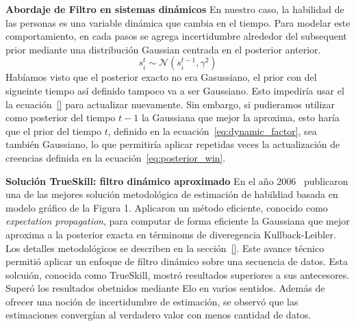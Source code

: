 \documentclass[article]{jss}
\newif\ifen
\newif\ifes
\newcommand{\en}[1]{\ifen#1\fi}
\newcommand{\es}[1]{\ifes#1\fi}
\newcommand{\N}{\mathcal{N}}
\begin{document}

\textbf{Abordaje de Filtro en sistemas dinámicos}
%
En nuestro caso, la habilidad de las personas es una variable dinámica que cambia en el tiempo.
%
Para modelar este comportamiento, en cada pasos se agrega incertidumbre alrededor del subsequent prior mediante una distribuci\'on Gaussian centrada en el posterior anterior.
%
\begin{equation}\label{eq:dynamic_factor}
 s_i^t \sim \N(s_i^{t-1}, \gamma^2)
 \end{equation}
%
Habíamos visto que el posterior exacto no era Gasussiano, el prior con del sigueinte tiempo así definido tampoco va a ser Gaussiano.
%
Esto impediría usar el la ecuación~\ref{} para actualizar nuevamente.
%
Sin embargo, si pudieramos utilizar como posterior del tiempo $t-1$ la Gaussiana que mejor la aproxima, esto haría que el prior del tiempo $t$, definido en la ecuación~\ref{eq:dynamic_factor}, sea también Gaussiano, lo que permitiría aplicar repetidas veces la actualización de creencias definida en la ecuación~\ref{eq:posterior_win}.
% 
\en{One of the main contributions of~\cite{herbrich2006-trueskill} was to offer an efficient method to find that Gaussian.}
\es{Uno de los principales aportes de~\cite{herbrich2006-trueskill} fue ofrecer un método eficiente para calcular esa Gaussiana.}



\textbf{Solución TrueSkill: filtro dinámico aproximado}
%
En el año 2006~\cite{herbrich2006-trueskill} publicaron una de las mejores solución metodológica de estimación de habildiad basada en modelo gráfico de la Figura 1.
%
Aplicaron un método eficiente, conocido como \emph{expectation propagation}, para computar de forma eficiente la Gaussiana que mejor aproxima a la posterior exacta en términoms de diveregencia Kullback-Leibler.
%
Los detalles metodológicos se describen en la sección~\ref{}.
%
Este avance técnico permitió aplicar un enfoque de filtro dinámico sobre una secuencia de datos.
%
Esta solcuión, conocida como TrueSkill, mostró resultados superiores a sus antecesores.
%
Superó los resultados obetnidos mediante Elo en varios sentidos.
%
Además de ofrecer una noción de incertidumbre de estimación, se observó que las estimaciones convergían al verdadero valor con menos cantidad de datos.
\end{document}
